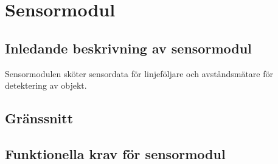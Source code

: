 \section{Sensormodul}
\subsection{Inledande beskrivning av sensormodul}
Sensormodulen sköter sensordata för linjeföljare och avståndsmätare för detektering av objekt. 

\subsection{Gränssnitt}
\begin{LIPSkravlista}
\end{LIPSkravlista}

\subsection{Funktionella krav för sensormodul}
\begin{LIPSkravlista}
\end{LIPSkravlista}
